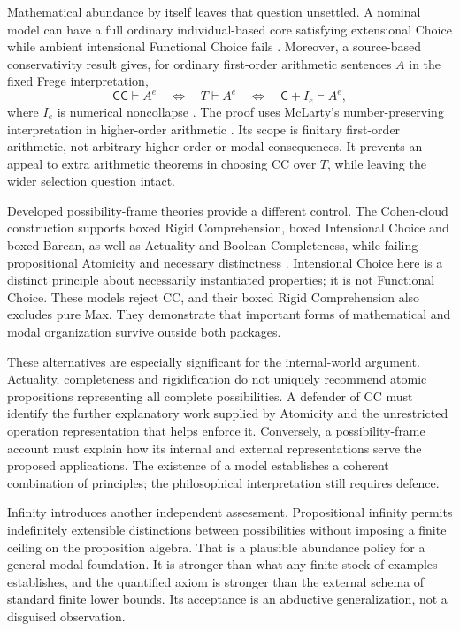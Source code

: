 \documentclass[11pt]{article}
\newcommand{\C}{\mathsf C}
\newcommand{\CC}{\mathsf{CC}}
\begin{document}
Mathematical abundance by itself leaves that question unsettled. A nominal model can have a full ordinary individual-based core satisfying extensional Choice while ambient intensional Functional Choice fails \citep[\S\S12.1,17]{gallincore}. Moreover, a source-based conservativity result gives, for ordinary first-order arithmetic sentences $A$ in the fixed Frege interpretation,
\[
 \CC\vdash A^e\quad\Longleftrightarrow\quad
 T\vdash A^e\quad\Longleftrightarrow\quad\C+I_e\vdash A^e,
\]
where $I_e$ is numerical noncollapse \citep[\S36]{fregechoice}\citep[Theorem~5]{uniformitynote}. The proof uses McLarty's number-preserving interpretation in higher-order arithmetic \citep[\S\S2--5]{mclarty}. Its scope is finitary first-order arithmetic, not arbitrary higher-order or modal consequences. It prevents an appeal to extra arithmetic theorems in choosing CC over $T$, while leaving the wider selection question intact.

Developed possibility-frame theories provide a different control. The Cohen-cloud construction supports boxed Rigid Comprehension, boxed Intensional Choice and boxed Barcan, as well as Actuality and Boolean Completeness, while failing propositional Atomicity and necessary distinctness \citep[Corollary~4.5 and Remark~4.6, p.~21]{modalized}. Intensional Choice here is a distinct principle about necessarily instantiated properties; it is not Functional Choice. These models reject CC, and their boxed Rigid Comprehension also excludes pure Max. They demonstrate that important forms of mathematical and modal organization survive outside both packages.

These alternatives are especially significant for the internal-world argument. Actuality, completeness and rigidification do not uniquely recommend atomic propositions representing all complete possibilities. A defender of CC must identify the further explanatory work supplied by Atomicity and the unrestricted operation representation that helps enforce it. Conversely, a possibility-frame account must explain how its internal and external representations serve the proposed applications. The existence of a model establishes a coherent combination of principles; the philosophical interpretation still requires defence.

Infinity introduces another independent assessment. Propositional infinity permits indefinitely extensible distinctions between possibilities without imposing a finite ceiling on the proposition algebra. That is a plausible abundance policy for a general modal foundation. It is stronger than what any finite stock of examples establishes, and the quantified axiom is stronger than the external schema of standard finite lower bounds. Its acceptance is an abductive generalization, not a disguised observation.
\end{document}
